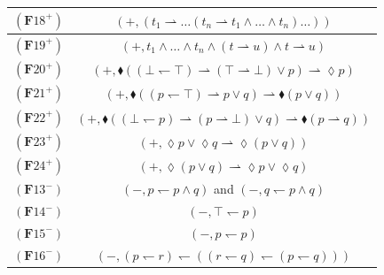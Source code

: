 \documentclass[draft]{article}
\def\Formula{\mathbf{A}}
\def\Formula{\mathbf{F}}
\begin{document}
\begin{table}[ht]
\begin{center}
\begin{tabular}{|c|c|}
%
%
\hline
%
%
$(\Formula18^{+})$&$(+,(t_{1}{\rightharpoonup}\ldots(t_{n}{\rightharpoonup}t_{1}{\wedge}\ldots{\wedge}t_{n})\ldots))$
%
%
\\
%
%
\hline
%
%
%
%
%
%
%
%
$(\Formula19^{+})$&$(+,t_{1}{\wedge}\ldots{\wedge}t_{n}{\wedge}(t{\rightharpoonup}u){\wedge}t{\rightharpoonup}u)$
%
%
\\
%
%
\hline
%
%
%
%
%
%
%
%
$(\Formula20^{+})$&$(+,{\blacklozenge}(({\bot}{\leftharpoondown}{\top}){\rightharpoonup}({\top}{\rightharpoonup}{\bot}){\vee}p){\rightharpoonup}{\lozenge}p)$
%
%
\\
%
%
\hline
%
%
$(\Formula21^{+})$&$(+,{\blacklozenge}((p{\leftharpoondown}{\top}){\rightharpoonup}p{\vee}q){\rightharpoonup}{\blacklozenge}(p{\vee}q))$
%
\\
%
%
\hline
%
%
$(\Formula22^{+})$&$(+,{\blacklozenge}(({\bot}{\leftharpoondown}p){\rightharpoonup}(p{\rightharpoonup}{\bot}){\vee}q){\rightharpoonup}{\blacklozenge}(p{\rightharpoonup}q))$
%
\\
%
%
\hline
%
%
$(\Formula23^{+})$&$(+,{\lozenge}p{\vee}{\lozenge}q{\rightharpoonup}{\lozenge}(p{\vee}q))$
%
%
\\
%
%
\hline
%
%
$(\Formula24^{+})$&$(+,{\lozenge}(p{\vee}q){\rightharpoonup}{\lozenge}p{\vee}{\lozenge}q)$
%
%
\\
%
%
\hline
%
%
$(\Formula13^{-})$&$(-,p{\leftharpoondown}p{\wedge}q)$ and $(-,q{\leftharpoondown}p{\wedge}q)$
%
%
\\
%
%
\hline
%
%
$(\Formula14^{-})$&$(-,\top{\leftharpoondown}p)$
%
%
\\
%
%
\hline
%
%
$(\Formula15^{-})$&$(-,p{\leftharpoondown}p)$
%
%
\\
%
%
\hline
%
%
$(\Formula16^{-})$&$(-,(p{\leftharpoondown}r){\leftharpoondown}((r{\leftharpoondown}q){\leftharpoondown}(p{\leftharpoondown}q)))$
%
%
\\
%
%
\hline
%
%
%
%
%
%
%
%
%
%

\end{tabular}
\end{center}
\end{table}
\end{document}
